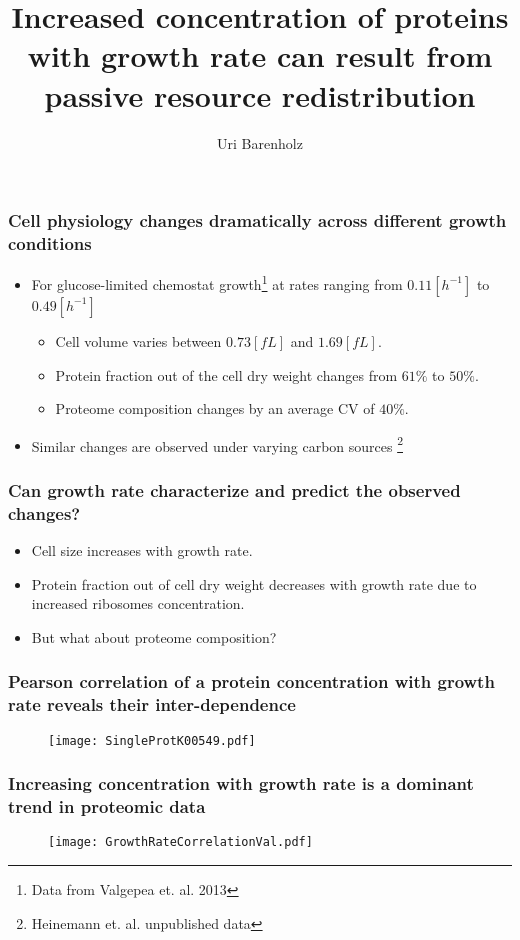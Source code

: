 \documentclass{beamer}
\title{Increased concentration of proteins with growth rate can result from passive resource redistribution}
\author{Uri Barenholz}
\begin{document}
\maketitle
\begin{frame}
\frametitle{Cell physiology changes dramatically across different growth conditions}
\begin{itemize}[<+->]
\item For glucose-limited chemostat growth\footnote{Data from Valgepea et. al. 2013} at rates ranging from $0.11 [h^{-1}]$ to $0.49 [h^{-1}]$
\begin{itemize}
\item Cell volume varies between $0.73 [fL]$ and $1.69 [fL]$.
\item Protein fraction out of the cell dry weight changes from $61\%$ to $50\%$.
\item Proteome composition changes by an average CV of $40\%$.
\end{itemize}
\item Similar changes are observed under varying carbon sources
\footnote{Heinemann et. al. unpublished data}
\end{itemize}
\end{frame}

\begin{frame}
\frametitle{Can growth rate characterize and predict the observed changes?}
\begin{itemize}[<+->]

\item Cell size increases with growth rate.
\item Protein fraction out of cell dry weight decreases with growth rate due to increased ribosomes concentration.
\item But what about proteome composition?
\end{itemize}
\end{frame}

\begin{frame}
\frametitle{Pearson correlation of a protein concentration with growth rate reveals their inter-dependence}
\begin{figure}[h!]
\centering
\texttt{[image: SingleProtK00549.pdf]}
\end{figure}
\end{frame}

\begin{frame}
\frametitle{Increasing concentration with growth rate is a dominant trend in proteomic data}
\begin{figure}[h!]
\centering
\texttt{[image: GrowthRateCorrelationVal.pdf]}
\end{figure}
\end{frame}
\end{document}
